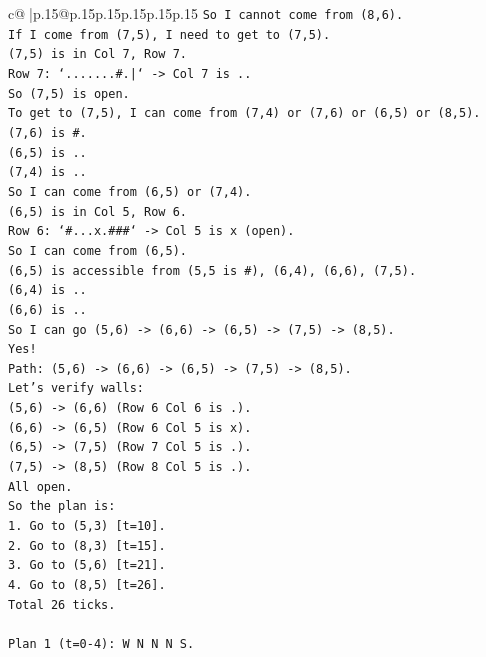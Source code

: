 \documentclass{article}
\begin{document}
{\begin{supertabular}{c@{$\;$}|p{.15\linewidth}@{}p{.15\linewidth}p{.15\linewidth}p{.15\linewidth}p{.15\linewidth}p{.15\linewidth}}
{{{\texttt{So I cannot come from (8,6).} \\
\texttt{If I come from (7,5), I need to get to (7,5).} \\
\texttt{(7,5) is in Col 7, Row 7.} \\
\texttt{Row 7: `.......\#.|` {-}> Col 7 is ..} \\
\texttt{So (7,5) is open.} \\
\texttt{To get to (7,5), I can come from (7,4) or (7,6) or (6,5) or (8,5).} \\
\texttt{(7,6) is \#.} \\
\texttt{(6,5) is ..} \\
\texttt{(7,4) is ..} \\
\texttt{So I can come from (6,5) or (7,4).} \\
\texttt{(6,5) is in Col 5, Row 6.} \\
\texttt{Row 6: `\#...x.\#\#\#` {-}> Col 5 is x (open).} \\
\texttt{So I can come from (6,5).} \\
\texttt{(6,5) is accessible from (5,5 is \#), (6,4), (6,6), (7,5).} \\
\texttt{(6,4) is ..} \\
\texttt{(6,6) is ..} \\
\texttt{So I can go (5,6) {-}> (6,6) {-}> (6,5) {-}> (7,5) {-}> (8,5).} \\
\texttt{Yes!} \\
\texttt{Path: (5,6) {-}> (6,6) {-}> (6,5) {-}> (7,5) {-}> (8,5).} \\
\texttt{Let's verify walls:} \\
\texttt{(5,6) {-}> (6,6) (Row 6 Col 6 is .).} \\
\texttt{(6,6) {-}> (6,5) (Row 6 Col 5 is x).} \\
\texttt{(6,5) {-}> (7,5) (Row 7 Col 5 is .).} \\
\texttt{(7,5) {-}> (8,5) (Row 8 Col 5 is .).} \\
\texttt{All open.} \\
\texttt{So the plan is:} \\
\texttt{1. Go to (5,3) {[}t=10{]}.} \\
\texttt{2. Go to (8,3) {[}t=15{]}.} \\
\texttt{3. Go to (5,6) {[}t=21{]}.} \\
\texttt{4. Go to (8,5) {[}t=26{]}.} \\
\texttt{Total 26 ticks.} \\
\\ 
\texttt{Plan 1 (t=0{-}4): W N N N S.} \\
}}}
\end{supertabular}}
\end{document}
